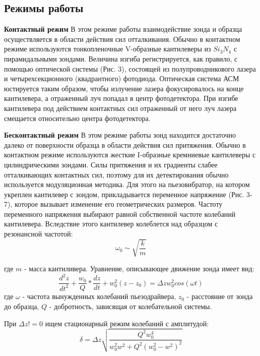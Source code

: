 \documentclass[a4paper]{article}
\begin{document}
\subsection{Режимы работы}

\textbf{Контактный режим}
В этом режиме работы взаимодействие зонда и образца осуществляется в области действия сил отталкивания. Обычно в контактном режиме используются тонкопленочные V-образные кантилеверы из \textit{$Si_3N_4$} с пирамидальными зондами. Величина изгиба регистрируется, как правило, с помощью оптической системы (Рис. 3), состоящей из полупроводникового лазера и четырехсекционного (квадрантного) фотодиода. Оптическая система АСМ юстируется таким образом, чтобы излучение лазера фокусировалось на конце кантилевера, а отраженный луч попадал в центр фотодетектора. При изгибе кантилевера под действием контактных сил отраженный от него луч лазера смещается относительно центра фотодетектора.

\textbf{Бесконтактный режим}
В этом режиме работы зонд находится достаточно далеко от поверхности образца в области действия сил притяжения. Обычно в контактном режиме используются жесткие I-образные кремниевые кантилеверы с цилиндрическими зондами.
Силы притяжения и их градиенты слабее отталкивающих контактных сил, поэтому для их детектирования обычно используется модуляционная методика. Для этого на пьезовибратор, на котором укреплен кантилевер с зондом, прикладывается переменное напряжение (Рис. 3-7), которое вызывает изменение его геометрических размеров. Частоту переменного напряжения выбирают равной собственной частоте колебаний кантилевера. Вследствие этого кантилевер колеблется над образцом с резонансной частотой:
\begin{equation}
\omega_0 \sim \sqrt{\frac{k}{m}}
\end{equation}

где \textit{$m$} - масса кантиливера. Уравнение, описывающее движение зонда имеет вид:
\begin{equation}
\frac{d^2z}{dt^2} + \frac{w_0}{Q}*\frac{dz}{dt} + w^2_0(z-z_0) = \Delta z w^2_0 cos(\omega t)
\end{equation}
где \textit{$\omega$} - частота вынужденных колебаний пьезодрайвера, \textit{$z_0$} - расстояние от зонда до образца, \textit{$Q$} - добротность, зависящая от колебательной системы.

При \textit{$\Delta z != 0$} ищем стационарный режим колебаний с амплитудой:
\begin{equation}
\delta = \Delta z \sqrt{\frac{Q^2w^4_0}{w^2_0w^2 + Q^2(w^2_0 - w^2)^2}}
\end{equation}
\end{document}
